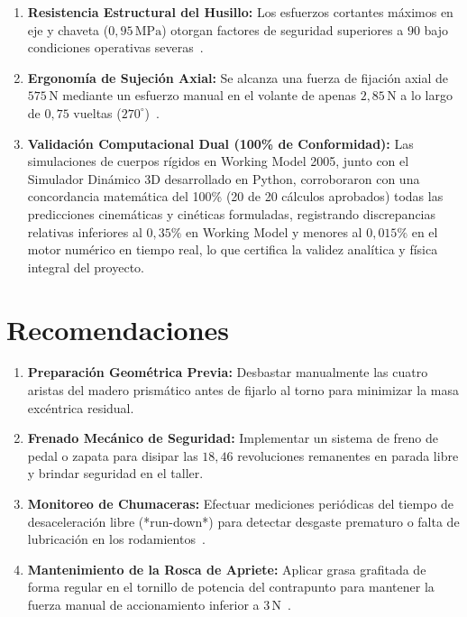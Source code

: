 \documentclass[12pt,a4paper]{article}
\begin{document}
\begin{enumerate}[leftmargin=18pt, itemsep=4pt, parsep=2pt]
    \item \textbf{Resistencia Estructural del Husillo:} Los esfuerzos cortantes máximos en eje y chaveta ($0{,}95\,\text{MPa}$) otorgan factores de seguridad superiores a $90$ bajo condiciones operativas severas~\cite{shigley2015}.
    \item \textbf{Ergonomía de Sujeción Axial:} Se alcanza una fuerza de fijación axial de $575\,\text{N}$ mediante un esfuerzo manual en el volante de apenas $2{,}85\,\text{N}$ a lo largo de $0{,}75$ vueltas ($270^\circ$)~\cite{norton2013}.
    \item \textbf{Validación Computacional Dual (100\% de Conformidad):} Las simulaciones de cuerpos rígidos en Working Model 2005, junto con el Simulador Dinámico 3D desarrollado en Python, corroboraron con una concordancia matemática del 100\% (20 de 20 cálculos aprobados) todas las predicciones cinemáticas y cinéticas formuladas, registrando discrepancias relativas inferiores al $0{,}35\%$ en Working Model y menores al $0{,}015\%$ en el motor numérico en tiempo real, lo que certifica la validez analítica y física integral del proyecto.
\end{enumerate}

\section{Recomendaciones}
\begin{enumerate}[leftmargin=18pt, itemsep=4pt, parsep=2pt]
    \item \textbf{Preparación Geométrica Previa:} Desbastar manualmente las cuatro aristas del madero prismático antes de fijarlo al torno para minimizar la masa excéntrica residual.
    \item \textbf{Frenado Mecánico de Seguridad:} Implementar un sistema de freno de pedal o zapata para disipar las $18{,}46$ revoluciones remanentes en parada libre y brindar seguridad en el taller.
    \item \textbf{Monitoreo de Chumaceras:} Efectuar mediciones periódicas del tiempo de desaceleración libre (*run-down*) para detectar desgaste prematuro o falta de lubricación en los rodamientos~\cite{urinov2024}.
    \item \textbf{Mantenimiento de la Rosca de Apriete:} Aplicar grasa grafitada de forma regular en el tornillo de potencia del contrapunto para mantener la fuerza manual de accionamiento inferior a $3\,\text{N}$~\cite{shigley2015}.
\end{enumerate}
\end{document}
